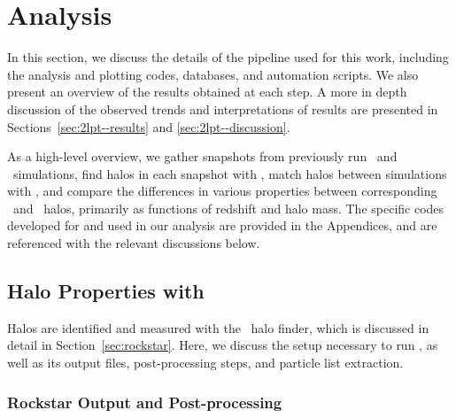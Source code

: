 
%
%

\section{Analysis}
\label{sec:analysis}



In this section, we discuss the details of the pipeline used for this work, including the analysis and plotting codes, databases, and automation scripts.  We also present an overview of the results obtained at each step.  A more in depth discussion of the observed trends and interpretations of results are presented in Sections~\ref{sec:2lpt--results} and \ref{sec:2lpt--discussion}.

As a high-level overview, we gather snapshots from previously run \lpt\ and \za\ simulations, find halos in each snapshot with \rockstar, match halos between simulations with \crossmatch, and compare the differences in various properties between corresponding \lpt\ and \za\ halos, primarily as functions of redshift and halo mass.  The specific codes developed for and used in our analysis are provided in the Appendices, and are referenced with the relevant discussions below.




\subsection{Halo Properties with \rockstar}
\label{subsec:analysis--halo_properties}


Halos are identified and measured with the \rockstar\ halo finder, which is discussed in detail in Section~\ref{sec:rockstar}.  Here, we discuss the setup necessary to run \rockstar, as well as its output files, post-processing steps, and particle list extraction.



\subsubsection{Rockstar Output and Post-processing}
\label{subsubsec:analysis--halo_properties--output}


